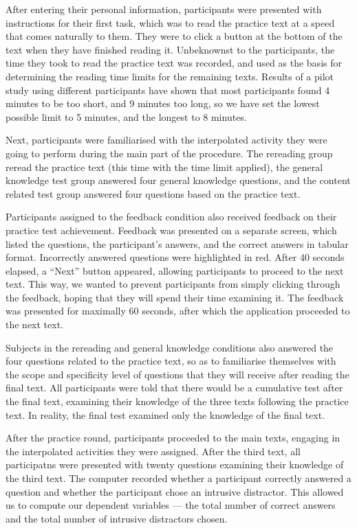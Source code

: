 \documentclass[11pt,]{article}
\begin{document}
After entering their personal information, participants were presented
with instructions for their first task, which was to read the practice
text at a speed that comes naturally to them. They were to click a
button at the bottom of the text when they have finished reading it.
Unbeknownst to the participants, the time they took to read the practice
text was recorded, and used as the basis for determining the reading
time limits for the remaining texts. Results of a pilot study using
different participants have shown that most participants found 4 minutes
to be too short, and 9 minutes too long, so we have set the lowest
possible limit to 5 minutes, and the longest to 8 minutes.

Next, participants were familiarised with the interpolated activity they
were going to perform during the main part of the procedure. The
rereading group reread the practice text (this time with the time limit
applied), the general knowledge test group answered four general
knowledge questions, and the content related test group answered four
questions based on the practice text.

Participants assigned to the feedback condition also received feedback
on their practice test achievement. Feedback was presented on a separate
screen, which listed the questions, the participant's answers, and the
correct answers in tabular format. Incorrectly answered questions were
highlighted in red. After 40 seconds elapsed, a ``Next'' button
appeared, allowing participants to proceed to the next text. This way,
we wanted to prevent participants from simply clicking through the
feedback, hoping that they will spend their time examining it. The
feedback was presented for maximally 60 seconds, after which the
application proceeded to the next text.

Subjects in the rereading and general knowledge conditions also answered
the four questions related to the practice text, so as to familiarise
themselves with the scope and specificity level of questions that they
will receive after reading the final text. All participants were told
that there would be a cumulative test after the final text, examining
their knowledge of the three texts following the practice text. In
reality, the final test examined only the knowledge of the final text.

After the practice round, participants proceeded to the main texts,
engaging in the interpolated activities they were assigned. After the
third text, all participatns were presented with twenty questions
examining their knowledge of the third text. The computer recorded
whether a participant correctly answered a question and whether the
participant chose an intrusive distractor. This allowed us to compute
our dependent variables --- the total number of correct answers and the
total number of intrusive distractors chosen.
\end{document}

